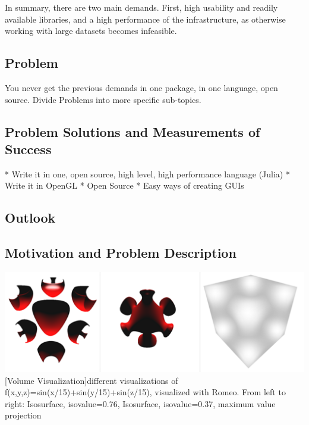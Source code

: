 In summary, there are two main demands. First, high usability and readily available libraries, and a high performance of the infrastructure, as otherwise working with large datasets becomes infeasible.

\subsection{Problem}
You never get the previous demands in one package, in one language, open source. Divide Problems into more specific sub-topics.
 
\subsection{Problem Solutions and Measurements of Success}
* Write it in one, open source, high level, high performance language (Julia)
* Write it in OpenGL
* Open Source
* Easy ways of creating GUIs

\subsection{Outlook}

\subsection{Motivation and Problem Description}

\vspace{1em}
\begin{minipage}{\linewidth}
    \centering
    \includegraphics[width=0.7\linewidth]{Bilder/surfaces.png}
    [Volume Visualization]{different visualizations of f(x,y,z)=sin(x/15)+sin(y/15)+sin(z/15), visualized with Romeo. From left to right: Isosurface, isovalue=0.76, Isosurface, isovalue=0.37, maximum value projection}
    \label{fig:volume}
\end{minipage}

